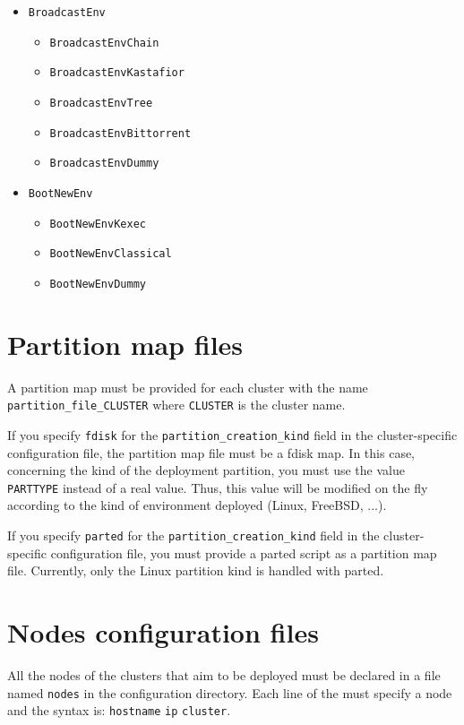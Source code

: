 \documentclass[a4wide,10pt,oneside]{book}
\begin{document}
\begin{itemize}
\begin{itemize}
  \item \texttt{BroadcastEnv}
    \begin{itemize}
      \item \texttt{BroadcastEnvChain}
      \item \texttt{BroadcastEnvKastafior}
      \item \texttt{BroadcastEnvTree}
      \item \texttt{BroadcastEnvBittorrent}
      \item \texttt{BroadcastEnvDummy}
    \end{itemize}
  \item \texttt{BootNewEnv}
    \begin{itemize}
      \item \texttt{BootNewEnvKexec}
      \item \texttt{BootNewEnvClassical}
      \item \texttt{BootNewEnvDummy}
    \end{itemize}
  \end{itemize}
\end{itemize}

\section{Partition map files}
A partition map must be provided for each cluster with the name \texttt{partition\_file\_CLUSTER} where \texttt{CLUSTER} is the cluster name. 

If you specify \texttt{fdisk} for the \texttt{partition\_creation\_kind} field in the cluster-specific configuration file, the partition map file must be a fdisk map. In this case, concerning the kind of the deployment partition, you must use the value \texttt{PARTTYPE} instead of a real value. Thus, this value will be modified on the fly according to the kind of environment deployed (Linux, FreeBSD, ...).

If you specify \texttt{parted} for the \texttt{partition\_creation\_kind} field in the cluster-specific configuration file, you must provide a parted script as a partition map file. Currently, only the Linux partition kind is handled with parted.

\section{Nodes configuration files}
All the nodes of the clusters that aim to be deployed must be declared in a file named \texttt{nodes} in the configuration directory. Each line of the must specify a node and the syntax is: \texttt{hostname} \texttt{ip} \texttt{cluster}.
\end{document}
